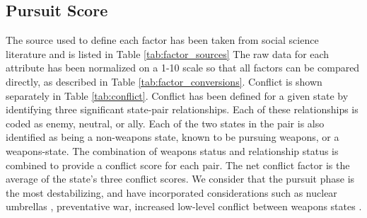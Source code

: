 \subsection{Pursuit Score}\label{s_pe}
The source used to define each factor has been taken from social science literature and is listed in Table \ref{tab:factor_sources} The raw data for each attribute has been normalized on a 1-10 scale so that all factors can be compared directly, as described in Table \ref{tab:factor_conversions}. Conflict is shown separately in Table \ref{tab:conflict}. Conflict has been defined for a given state by identifying three significant state-pair relationships.  Each of these relationships is coded as enemy, neutral, or ally.  Each of the two states in the pair is also identified as being a non-weapons state, known to be pursuing weapons, or a weapons-state.  The combination of weapons status and relationship status is combined to provide a conflict score for each pair. The net conflict factor is the average of the state's three conflict scores. We consider that the pursuit phase is the most destabilizing, and have incorporated considerations such as nuclear umbrellas ,  preventative war, increased low-level conflict between weapons states \cite{geller_nuclear_1990, fuhrmann_targeting_2010, bell_questioning_2013-1}.


